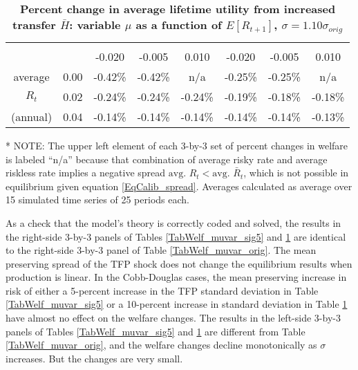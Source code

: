 \documentclass[letterpaper,12pt]{article}
\theoremstyle{definition}
\newcommand\ve{\varepsilon}
\begin{document}
  \begin{table}[htbp]\centering\captionsetup{width=5.0in}
  \caption{\label{TabWelf_muvar_sig10}\textbf{Percent change in average lifetime utility from increased transfer $\bar{H}$: variable $\mu$ as a function of $E[R_{t+1}]$, $\sigma=1.10\sigma_{orig}$}}
    \begin{threeparttable}
    \begin{tabular}{>{\normalsize}c >{\normalsize}c |>{\normalsize}c >{\normalsize}c >{\normalsize}c |>{\normalsize}c >{\normalsize}c >{\normalsize}c}
      \hline\hline
      & & \multicolumn{3}{c}{Linear production $\ve=\infty$} & \multicolumn{3}{c}{Cobb-Douglas $\ve=1$} \\
      \hline
      & & \multicolumn{3}{c}{average $\bar{R}$ (annual)} & \multicolumn{3}{c}{average $\bar{R}$ (annual)} \\
      & & -0.020 & -0.005 & 0.010 & -0.020 & -0.005 & 0.010 \\
      \hline
      average  & 0.00 & -0.42\% & -0.42\% &   n/a   & -0.25\% & -0.25\% & n/a \\
      $R_t$    & 0.02 & -0.24\% & -0.24\% & -0.24\% & -0.19\% & -0.18\% & -0.18\% \\
      (annual) & 0.04 & -0.14\% & -0.14\% & -0.14\% & -0.14\% & -0.14\% & -0.13\% \\
      \hline\hline
    \end{tabular}
    \begin{tablenotes}
      \scriptsize{\item[*]NOTE: The upper left element of each 3-by-3 set of percent changes in welfare is labeled ``n/a'' because that combination of average risky rate and average riskless rate implies a negative spread $\text{avg. }R_t<\text{avg. }\bar{R}_t$, which is not possible in equilibrium given equation \eqref{EqCalib_spread}. Averages calculated as average over 15 simulated time series of 25 periods each.}
    \end{tablenotes}
    \end{threeparttable}
  \end{table}

  As a check that the model's theory is correctly coded and solved, the results in the right-side 3-by-3 panels of Tables \ref{TabWelf_muvar_sig5} and \ref{TabWelf_muvar_sig10} are identical to the right-side 3-by-3 panel of Table \ref{TabWelf_muvar_orig}. The mean preserving spread of the TFP shock does not change the equilibrium results when production is linear. In the Cobb-Douglas cases, the mean preserving increase in risk of either a 5-percent increase in the TFP standard deviation in Table \ref{TabWelf_muvar_sig5} or a 10-percent increase in standard deviation in Table \ref{TabWelf_muvar_sig10} have almost no effect on the welfare changes. The results in the left-side 3-by-3 panels of Tables \ref{TabWelf_muvar_sig5} and \ref{TabWelf_muvar_sig10} are different from Table \ref{TabWelf_muvar_orig}, and the welfare changes decline monotonically as $\sigma$ increases. But the changes are very small.
\end{document}

